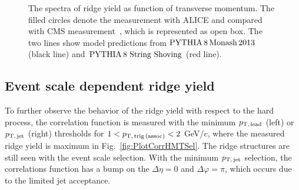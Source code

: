 \begin{figure}[h!]
	\centering
	\caption{ The spectra of ridge yield as function of transverse momentum. The filled circles denote the measurement with ALICE and compared with CMS measurement~\cite{Khachatryan:2015lva}, which is represented as open box. The two lines show model predictions from $\mathrm{PYTHIA}\,8\,\mathrm{Monash}\,2013$ (black line) and $\mathrm{PYTHIA}\,8~\mathrm{String}~\mathrm{Shoving}$ (red line). }
	\label{fig:PlotYSpect}
\end{figure}

\subsection{Event scale dependent ridge yield}

To further observe the behavior of the ridge yield with respect to the hard process, the correlation function is measured with the minimum $p_\mathrm{T,\,lead}$ (left) or $p_\mathrm{T,\,jet}$ (right) thresholds for $1<p_\mathrm{T,\,trig\,(assoc)}<2$ GeV/$c$, where the measured ridge yield is maximum in Fig.~\ref{fig:PlotCorrHMTSel}. The ridge structures are still seen with the event scale selection. With the minimum $p_\mathrm{T,\,jet}$ selection, the correlations function has a bump on the $\Delta\eta = 0$ and $\Delta\varphi = \pi$, which occurs due to the limited jet acceptance.

